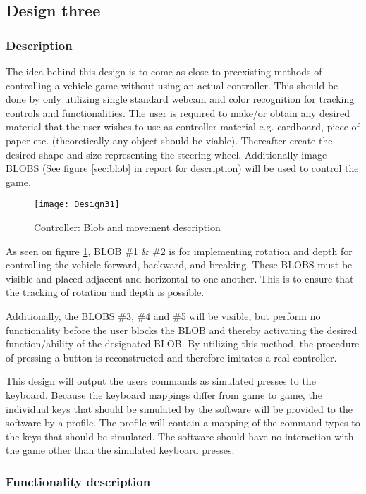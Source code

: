 \subsection{Design three}
\subsubsection*{Description}
The idea behind this design is to come as close to preexisting methods of controlling a vehicle game without using an actual controller. This should be done by only utilizing single standard webcam and color recognition for tracking controls and functionalities. The user is required to make/or obtain any desired material that the user wishes to use as controller material e.g. cardboard, piece of paper etc. (theoretically any object should be viable). Thereafter create the desired shape and size representing the steering wheel. 
Additionally image BLOBS (See figure \ref{sec:blob} in report for description) will be used to control the game. 
\begin{figure}[h]
\centering
\texttt{[image: Design31]}
\caption{Controller: Blob and movement description}
\label{fig:design31}
\end{figure}

As seen on figure \ref{fig:design31}, BLOB \#1 \& \#2 is for implementing rotation and depth for controlling the vehicle forward, backward, and breaking. These BLOBS must be visible and placed adjacent and horizontal to one another. This is to ensure that the tracking of rotation and depth is possible.

Additionally, the BLOBS \#3, \#4 and \#5 will be visible, but perform no functionality before the user blocks the BLOB and thereby activating the desired function/ability of the designated BLOB. By utilizing this method, the procedure of pressing a button is reconstructed and therefore imitates a real controller.
\bigskip

This design will output the users commands as simulated presses to the keyboard. 
Because the keyboard mappings differ from game to game, the individual keys that should be simulated by the software will be provided to the software by a profile.
The profile will contain a mapping of the command types to the keys that should be simulated. 
The software should have no interaction with the game other than the simulated keyboard presses.

\subsubsection*{Functionality description} \label{Dfunc}

